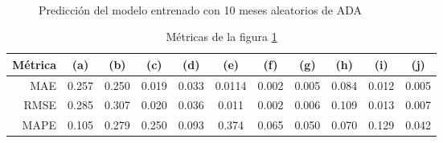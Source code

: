 \documentclass[a4paper,10pt]{article}
\begin{document}
\begin{figure}[H]
    \\
  \caption{Predicción del modelo entrenado con 10 meses aleatorios de ADA}
  \label{f:ada_mth_prophet}
\end{figure}

\begin{table}[H]
 \begin{center}
 \resizebox{12cm}{!} {
  \begin{tabular}{|r|c|c|c|c|c|c|c|c|c|c|}
    Métrica & (a) & (b) & (c) & (d) & (e) & (f) & (g) & (h) & (i) & (j) \\ \hline
    MAE & 0.257& 0.250& 0.019& 0.033& 0.0114& 0.002& 0.005& 0.084& 0.012& 0.005\\
    RMSE & 0.285& 0.307& 0.020& 0.036& 0.011& 0.002& 0.006& 0.109& 0.013& 0.007\\
    MAPE & 0.105& 0.279& 0.250& 0.093& 0.374& 0.065& 0.050& 0.070& 0.129& 0.042\\ \hline
  \end{tabular}
  }
  \caption{Métricas de la figura \ref{f:ada_mth_prophet}}
  \label{tab:ada_prophet_m}
 \end{center}
\end{table}
\end{document}
